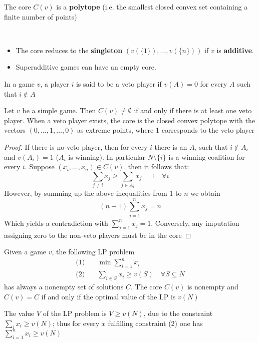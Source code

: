 \documentclass[../main.tex]{subfiles}
\begin{document}
\begin{proposition}
    The core $C(v)$ is a \textbf{polytope} (i.e. the smallest closed convex set containing a finite number of points)
\end{proposition}
\begin{note}\
    \begin{itemize}
        \item The core reduces to the \textbf{singleton} $(v(\{1\}),\ldots,v(\{n\}))$ if $v$ is \textbf{additive}.
        \item Superadditive games can have an empty core.
    \end{itemize}
\end{note}
\begin{definition}
    In a game $v$, a player $i$ is said to be a veto player if $v(A) = 0$ for every $A$ such that $i \notin A$
\end{definition}
\begin{theorem}
    Let $v$ be a simple game. Then $C(v) \neq \emptyset$ if and only if there is at least one veto player. When a veto player exists, the core is the closed convex polytope with the vectors $(0, \ldots , 1, \ldots , 0)$ as extreme points, where 1 corresponds to the veto player
\end{theorem}
\begin{proof}
    If there is no veto player, then for every $i$ there is an $A_i$ such that $i \notin A_i$ and $v(A_i) = 1$ ($A_i$ is winning). In particular $N \setminus \{i\}$ is a winning coalition for every $i$. Suppose $(x_i, \ldots, x_n) \in C(v)$. then it follows that:
    \[
        \sum_{j \neq i} x_j \geq \sum_{j \in A_i} x_j = 1 \quad \forall i
    \]
    However, by summing up the above inequalities from $1$ to $n$ we obtain
    \[
        (n-1) \sum_{j=1}^n x_j = n
    \]
    Which yields a contradiction with $\sum_{j=1}^{n} x_j = 1$. Conversely, any imputation assigning zero to the non-veto players must be in the core
\end{proof}
\begin{theorem}
    Given a game $v$, the following \gls{LP} problem
    \begin{align*}
        \text{(1)} & \quad \min \sum_{i=1}^n x_i                                    \\
        \text{(2)} & \quad \sum_{i \in S} x_i \geq v(S) \quad \forall S \subseteq N
    \end{align*}
    has always a nonempty set of solutions $C$. The core $C(v)$ is nonempty and $C (v) = C$ if and only if the optimal value of the \gls{LP} is $v(N)$
\end{theorem}
\begin{remark}
    The value $V$ of the \gls{LP} problem is $V \geq v (N)$, due to the constraint $\sum_i x_i \geq v(N)$; thus for every $x$ fulfilling constraint (2) one has $\sum_{i=1}^{n} x_i \geq v(N)$
\end{remark}
\end{document}
